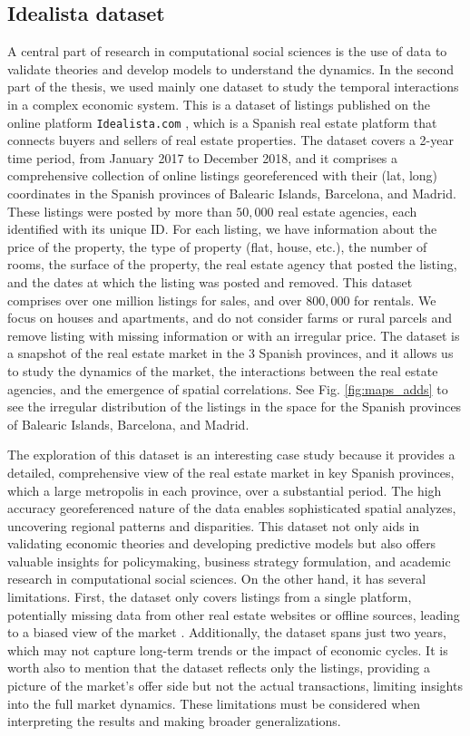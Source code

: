 \subsection{\label{subsec:Idealista dataset} Idealista dataset}

A central part of research in computational social sciences is the use of data to validate theories and develop models to understand the dynamics. In the second part of the thesis, we used mainly one dataset to study the temporal interactions in a complex economic system. This is a dataset of listings published on the online platform \texttt{Idealista.com} \cite{idealista}, which is a Spanish real estate platform that connects buyers and sellers of real estate properties. The dataset covers a 2-year time period, from January 2017 to December 2018, and it comprises a comprehensive collection of online listings georeferenced with their (lat, long) coordinates in the Spanish provinces of Balearic Islands, Barcelona, and Madrid. These listings were posted by more than $50,000$ real estate agencies, each identified with its unique ID. For each listing, we have information about the price of the property, the type of property (flat, house, etc.), the number of rooms, the surface of the property, the real estate agency that posted the listing, and the dates at which the listing was posted and removed. This dataset comprises over one million listings for sales, and over $800,000$ for rentals. We focus on houses and apartments, and do not consider farms or rural parcels and remove listing with missing information or with an irregular price. The dataset is a snapshot of the real estate market in the 3 Spanish provinces, and it allows us to study the dynamics of the market, the interactions between the real estate agencies, and the emergence of spatial correlations. See Fig. \ref{fig:maps_adds} to see the irregular distribution of the listings in the space for the Spanish provinces of Balearic Islands, Barcelona, and Madrid.

The exploration of this dataset is an interesting case study because it provides a detailed, comprehensive view of the real estate market in key Spanish provinces, which a large metropolis in each province, over a substantial period. The high accuracy georeferenced nature of the data enables sophisticated spatial analyzes, uncovering regional patterns and disparities. This dataset not only aids in validating economic theories and developing predictive models but also offers valuable insights for policymaking, business strategy formulation, and academic research in computational social sciences. On the other hand, it has several limitations. First, the dataset only covers listings from a single platform, potentially missing data from other real estate websites or offline sources, leading to a biased view of the market \cite{gonzalez2014assessing}. Additionally, the dataset spans just two years, which may not capture long-term trends or the impact of economic cycles. It is worth also to mention that the dataset reflects only the listings, providing a picture of the market's offer side but not the actual transactions, limiting insights into the full market dynamics. These limitations must be considered when interpreting the results and making broader generalizations.

